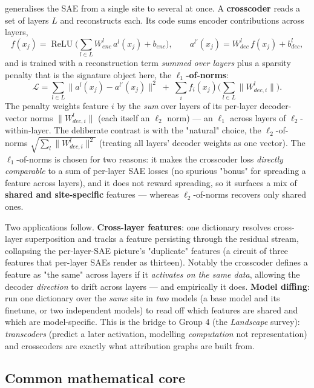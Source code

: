 \textcite{sparse-crosscoders-model-diffing} generalises the SAE from a single site to several at once. A \textbf{crosscoder} reads a set of layers $L$ and reconstructs each. Its code sums encoder contributions across layers,
\[
f(x_j)=\operatorname{ReLU}\!\Big(\textstyle\sum_{l\in L} W^{l}_{enc}\,a^{l}(x_j)+b_{enc}\Big),\qquad
a^{l\prime}(x_j)=W^{l}_{dec}\,f(x_j)+b^{l}_{dec},
\]
and is trained with a reconstruction term \emph{summed over layers} plus a sparsity penalty that is the signature object here, the \textbf{$\ell_1$-of-norms}:
\[
\mathcal{L}=\sum_{l\in L}\big\lVert a^{l}(x_j)-a^{l\prime}(x_j)\big\rVert^{2}
\;+\;\sum_i f_i(x_j)\Big(\textstyle\sum_{l\in L}\lVert W^{l}_{dec,i}\rVert\Big).
\]
The penalty weights feature $i$ by the \emph{sum} over layers of its per-layer decoder-vector norms $\lVert W^{l}_{dec,i}\rVert$ (each itself an $\ell_2$ norm) --- an $\ell_1$ across layers of $\ell_2$-within-layer. The deliberate contrast is with the "natural" choice, the $\ell_2$-of-norms $\sqrt{\sum_l\lVert W^{l}_{dec,i}\rVert^2}$ (treating all layers' decoder weights as one vector). The $\ell_1$-of-norms is chosen for two reasons: it makes the crosscoder loss \emph{directly comparable} to a sum of per-layer SAE losses (no spurious "bonus" for spreading a feature across layers), and it does not reward spreading, so it surfaces a mix of \textbf{shared and site-specific} features --- whereas $\ell_2$-of-norms recovers only shared ones.

Two applications follow. \textbf{Cross-layer features}: one dictionary resolves cross-layer superposition and tracks a feature persisting through the residual stream, collapsing the per-layer-SAE picture's "duplicate" features (a circuit of three features that per-layer SAEs render as thirteen). Notably the crosscoder defines a feature as "the same" across layers if it \emph{activates on the same data}, allowing the decoder \emph{direction} to drift across layers --- and empirically it does. \textbf{Model diffing}: run one dictionary over the \emph{same} site in \emph{two} models (a base model and its finetune, or two independent models) to read off which features are shared and which are model-specific. This is the bridge to Group 4 (the \emph{Landscape} survey): \emph{transcoders} (predict a later activation, modelling \emph{computation} not representation) and crosscoders are exactly what attribution graphs are built from.

\subsection*{Common mathematical core}

